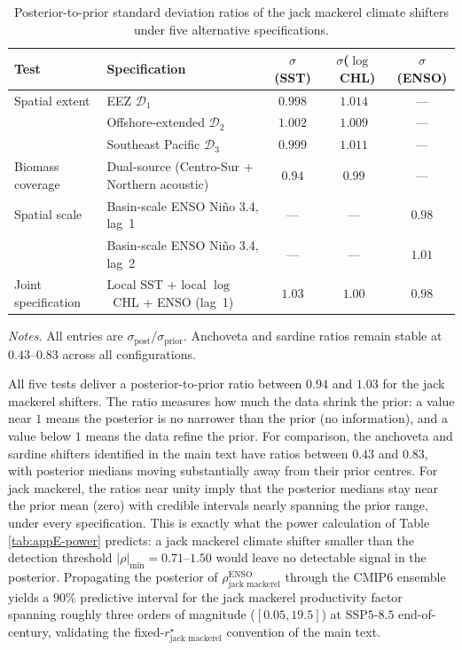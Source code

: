\documentclass[
  11pt,
]{article}
\begin{document}
\begin{table}[H]
\centering\small
\caption{Posterior-to-prior standard deviation ratios of the jack mackerel
climate shifters under five alternative specifications.\label{tab:appE-sigma}}
\begin{threeparttable}
\begin{tabular}{llccc}
\toprule
Test & Specification & $\sigma$(SST) & $\sigma$($\log$~CHL) & $\sigma$(ENSO) \\
\midrule
Spatial extent      & EEZ $\mathcal{D}_1$                         & $0.998$ & $1.014$ & ---     \\
                    & Offshore-extended $\mathcal{D}_2$           & $1.002$ & $1.009$ & ---     \\
                    & Southeast Pacific $\mathcal{D}_3$           & $0.999$ & $1.011$ & ---     \\
Biomass coverage    & Dual-source (Centro-Sur + Northern acoustic) & $0.94$  & $0.99$  & ---     \\
Spatial scale       & Basin-scale ENSO Niño 3.4, lag~1            & ---     & ---     & $0.98$  \\
                    & Basin-scale ENSO Niño 3.4, lag~2            & ---     & ---     & $1.01$  \\
Joint specification & Local SST + local $\log$~CHL + ENSO (lag~1) & $1.03$  & $1.00$  & $0.98$  \\
\bottomrule
\end{tabular}
\begin{tablenotes}[flushleft]\footnotesize
\item \emph{Notes.} All entries are $\sigma_{\text{post}}/\sigma_{\text{prior}}$. Anchoveta and sardine ratios remain stable at $0.43$--$0.83$ across all configurations.
\end{tablenotes}
\end{threeparttable}
\end{table}

All five tests deliver a posterior-to-prior ratio between \(0.94\) and
\(1.03\) for the jack mackerel shifters. The ratio measures how much the
data shrink the prior: a value near \(1\) means the posterior is no
narrower than the prior (no information), and a value below \(1\) means
the data refine the prior. For comparison, the anchoveta and sardine
shifters identified in the main text have ratios between \(0.43\) and
\(0.83\), with posterior medians moving substantially away from their
prior centres. For jack mackerel, the ratios near unity imply that the
posterior medians stay near the prior mean (zero) with credible
intervals nearly spanning the prior range, under every specification.
This is exactly what the power calculation of Table \ref{tab:appE-power}
predicts: a jack mackerel climate shifter smaller than the detection
threshold \(|\rho|_{\min}=0.71\)--\(1.50\) would leave no detectable signal
in the posterior. Propagating the posterior of
\(\rho_{\text{jack mackerel}}^{\text{ENSO}}\) through the CMIP6 ensemble
yields a \(90\%\) predictive interval for the jack mackerel productivity
factor spanning roughly three orders of magnitude (\([0.05, 19.5]\)) at
SSP\(5\)-\(8.5\) end-of-century, validating the
fixed-\(r^{\star}_{\text{jack mackerel}}\) convention of the main text.
\end{document}
